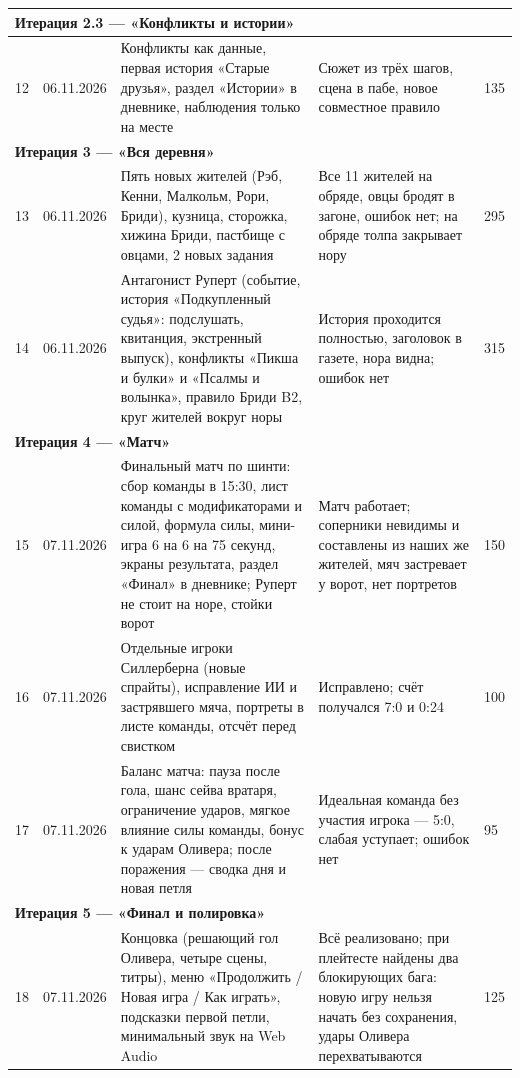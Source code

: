 {\begin{longtable}{|p{6mm}|p{17mm}|p{62mm}|p{58mm}|p{11mm}|}
\multicolumn{5}{|l|}{\textbf{Итерация 2.3 — «Конфликты и истории»}}\\\hline
12 & 06.11.2026 & Конфликты как данные, первая история «Старые друзья», раздел «Истории» в дневнике, наблюдения только на месте & Сюжет из трёх шагов, сцена в пабе, новое совместное правило & 135\\\hline
\multicolumn{5}{|l|}{\textbf{Итерация 3 — «Вся деревня»}}\\\hline
13 & 06.11.2026 & Пять новых жителей (Рэб, Кенни, Малкольм, Рори, Бриди), кузница, сторожка, хижина Бриди, пастбище с овцами, 2 новых задания & Все 11 жителей на обряде, овцы бродят в загоне, ошибок нет; на обряде толпа закрывает нору & 295\\\hline
14 & 06.11.2026 & Антагонист Руперт (событие, история «Подкупленный судья»: подслушать, квитанция, экстренный выпуск), конфликты «Пикша и булки» и «Псалмы и волынка», правило Бриди B2, круг жителей вокруг норы & История проходится полностью, заголовок в газете, нора видна; ошибок нет & 315\\\hline
\multicolumn{5}{|l|}{\textbf{Итерация 4 — «Матч»}}\\\hline
15 & 07.11.2026 & Финальный матч по шинти: сбор команды в 15:30, лист команды с модификаторами и силой, формула силы, мини-игра 6 на 6 на 75 секунд, экраны результата, раздел «Финал» в дневнике; Руперт не стоит на норе, стойки ворот & Матч работает; соперники невидимы и составлены из наших же жителей, мяч застревает у ворот, нет портретов & 150\\\hline
16 & 07.11.2026 & Отдельные игроки Силлерберна (новые спрайты), исправление ИИ и застрявшего мяча, портреты в листе команды, отсчёт перед свистком & Исправлено; счёт получался 7:0 и 0:24 & 100\\\hline
17 & 07.11.2026 & Баланс матча: пауза после гола, шанс сейва вратаря, ограничение ударов, мягкое влияние силы команды, бонус к ударам Оливера; после поражения — сводка дня и новая петля & Идеальная команда без участия игрока — 5:0, слабая уступает; ошибок нет & 95\\\hline
\multicolumn{5}{|l|}{\textbf{Итерация 5 — «Финал и полировка»}}\\\hline
18 & 07.11.2026 & Концовка (решающий гол Оливера, четыре сцены, титры), меню «Продолжить / Новая игра / Как играть», подсказки первой петли, минимальный звук на Web Audio & Всё реализовано; при плейтесте найдены два блокирующих бага: новую игру нельзя начать без сохранения, удары Оливера перехватываются & 125\\\hline
\end{longtable}}
